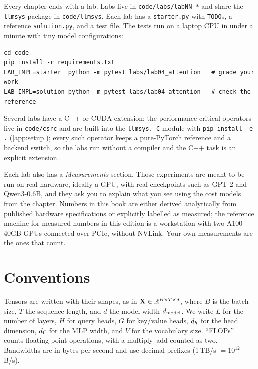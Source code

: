 Every chapter ends with a lab. Labs live in \texttt{code/labs/labNN\_*} and share the
\texttt{llmsys} package in \texttt{code/llmsys}. Each lab has a \texttt{starter.py} with
\texttt{TODO}s, a reference \texttt{solution.py}, and a test file. The tests run on a laptop CPU
in under a minute with tiny model configurations:

\begin{lstlisting}[style=shell]
cd code
pip install -r requirements.txt
LAB_IMPL=starter  python -m pytest labs/lab04_attention   # grade your work
LAB_IMPL=solution python -m pytest labs/lab04_attention   # check the reference
\end{lstlisting}

Several labs have a C++ or CUDA extension: the performance-critical operators live in
\texttt{code/csrc} and are built into the \texttt{llmsys.\_C} module with \texttt{pip install -e .}
(\cref{app:setup}); every such operator keeps a pure-PyTorch reference and a backend switch, so the
labs run without a compiler and the C++ task is an explicit extension.

Each lab also has a \emph{Measurements} section. Those experiments are meant to be run on
real hardware, ideally a GPU, with real checkpoints such as GPT-2 and Qwen3-0.6B, and they ask you to
explain what you see using the cost models from the chapter. Numbers in this book are either
derived analytically from published hardware specifications or explicitly labelled as measured; the
reference machine for measured numbers in this edition is a workstation with two A100-40GB GPUs
connected over PCIe, without NVLink. Your own measurements are the ones that count.

\section*{Conventions}

Tensors are written with their shapes, as in $\mathbf{X}\in\mathbb{R}^{B\times T\times d}$, where
$B$ is the batch size, $T$ the sequence length, and $d$ the model width $d_{\text{model}}$. We write $L$ for the number of layers,
$H$ for query heads, $G$ for key/value heads, $d_{h}$ for the head dimension, $d_{\text{ff}}$ for the MLP
width, and $V$ for the vocabulary size. ``FLOPs'' counts floating-point operations, with a
multiply--add counted as two. Bandwidths are in bytes per second and use decimal prefixes
(1\,TB/s $=10^{12}$\,B/s).
